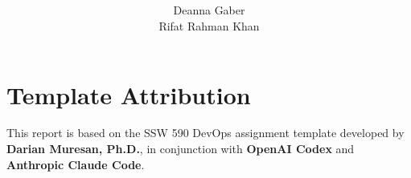 \title{\CourseNumber\ \AssignmentTitle\\[1.5em]\normalsize\VERSION\\\DocumentStatus}
\author{Deanna Gaber\\Rifat Rahman Khan\\\Organization}
\conferraldate{}{\DocumentDate}
\copyrightholder{\Organization}
\maketitle
\makecopyright

\cleardoublepage
{}
\chapter*{Template Attribution}
This report is based on the SSW 590 DevOps assignment template developed by
\textbf{Darian Muresan, Ph.D.}, in conjunction with \textbf{OpenAI Codex} and
\textbf{Anthropic Claude Code}.

\clearpage
\begin{abstract}\end{abstract}

\contentspage
\tablelistpage
\figurelistpage
